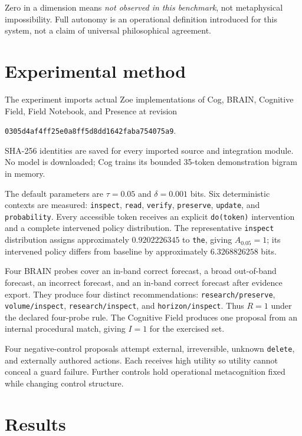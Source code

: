 \documentclass[11pt,a4paper]{article}
\begin{document}
Zero in a dimension means \emph{not observed in this benchmark}, not metaphysical impossibility. Full autonomy is an operational definition introduced for this system, not a claim of universal philosophical agreement.

\section{Experimental method}
The experiment imports actual Zoe implementations of Cog, BRAIN, Cognitive Field, Field Notebook, and Presence at revision
\begin{center}
\texttt{0305d4af4ff25e0a8ff5d8dd1642faba754075a9}.
\end{center}
SHA-256 identities are saved for every imported source and integration module. No model is downloaded; Cog trains its bounded 35-token demonstration bigram in memory.

The default parameters are $\tau=0.05$ and $\delta=0.001$ bits. Six deterministic contexts are measured: \texttt{inspect}, \texttt{read}, \texttt{verify}, \texttt{preserve}, \texttt{update}, and \texttt{probability}. Every accessible token receives an explicit \texttt{do(token)} intervention and a complete intervened policy distribution. The representative \texttt{inspect} distribution assigns approximately $0.9202226345$ to \texttt{the}, giving $A_{0.05}=1$; its intervened policy differs from baseline by approximately $6.3268826258$ bits.

Four BRAIN probes cover an in-band correct forecast, a broad out-of-band forecast, an incorrect forecast, and an in-band correct forecast after evidence export. They produce four distinct recommendations: \texttt{research/preserve}, \texttt{volume/inspect}, \texttt{research/inspect}, and \texttt{horizon/inspect}. Thus $R=1$ under the declared four-probe rule. The Cognitive Field produces one proposal from an internal procedural match, giving $I=1$ for the exercised set.

Four negative-control proposals attempt external, irreversible, unknown \texttt{delete}, and externally authored actions. Each receives high utility so utility cannot conceal a guard failure. Further controls hold operational metacognition fixed while changing control structure.

\section{Results}
\end{document}
